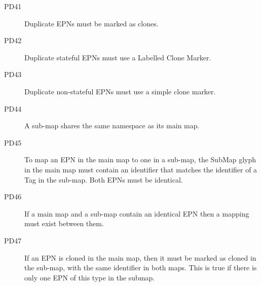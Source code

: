 \begin{description}
\item[PD41] Duplicate EPNs must be marked as clones.
\item[PD42] Duplicate stateful EPNs must use a Labelled Clone Marker.
\item[PD43] Duplicate non-stateful EPNs must use a simple clone marker.
\item[PD44] A sub-map shares the same namespace as its main map.
\item[PD45] To map an EPN in the main map to one in a sub-map, the SubMap glyph in the main map must contain an identifier that matches the identifier of a Tag in the sub-map. Both EPNs must be identical.
\item[PD46] If a main map and a sub-map contain an identical EPN then a mapping must exist between them.
\item[PD47] If an EPN is cloned in the main map, then it must be marked as cloned in the sub-map, with the same identifier in both maps. This is true if there is only one EPN of this type in the submap.
\end{description}
